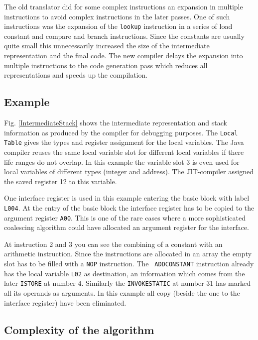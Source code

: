 The old translator did for some complex instructions an expansion in
multiple instructions to avoid complex instructions in the later passes.
One of such instructions was the expansion of the {\tt lookup} instruction
in a series of load constant and compare and branch instructions. Since
the constants are usually quite small this unnecessarily increased the
size of the intermediate representation and the final code. The new
compiler delays the expansion into multiple instructions to the code
generation pass which reduces all representations and speeds up the
compilation.


\subsection{Example}

Fig. \ref{IntermediateStack} shows the intermediate representation and
stack information as produced by the compiler for debugging purposes. The
{\tt Local Table} gives the types and register assignment for the local
variables. The Java compiler reuses the same local variable slot for
different local variables if there life ranges do not overlap. In this
example the variable slot 3 is even used for local variables of different
types (integer and address). The JIT-compiler assigned the saved register
12 to this variable.

One interface register is used in this example entering the basic block
with label {\tt L004}. At the entry of the basic block the interface
register has to be copied to the argument register {\tt A00}. This is one
of the rare cases where a more sophisticated coalescing algorithm could
have allocated an argument register for the interface.

At instruction 2 and 3 you can see the combining of a constant with an
arithmetic instruction. Since the instructions are allocated in an array
the empty slot has to be filled with a {\tt NOP} instruction. The {\tt
ADDCONSTANT} instruction already has the local variable {\tt L02} as
destination, an information which comes from the later {\tt ISTORE} at
number 4. Similarly the {\tt INVOKESTATIC} at number 31 has marked all its
operands as arguments. In this example all copy (beside the one to the
interface register) have been eliminated.


\subsection{Complexity of the algorithm}

